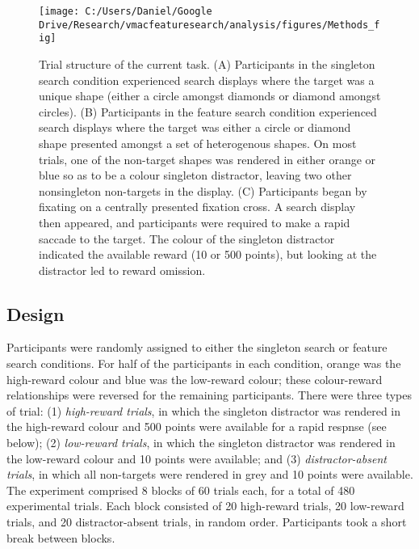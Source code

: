 \documentclass[man, a4paper, noextraspace, 11pt,floatsintext]{apa6}
\theoremstyle{definition}
\theoremstyle{definition}
\theoremstyle{definition}
\theoremstyle{remark}
\begin{document}
\begin{figure}[!h]

{\centering \texttt{[image: C:/Users/Daniel/Google Drive/Research/vmacfeaturesearch/analysis/figures/Methods\_fig]} 

}

\caption{Trial structure of the current task. (A) Participants in
the singleton search condition experienced search displays where the
target was a unique shape (either a circle amongst diamonds or diamond
amongst circles). (B) Participants in the feature search condition
experienced search displays where the target was either a circle or
diamond shape presented amongst a set of heterogenous shapes. On most
trials, one of the non-target shapes was rendered in either orange or
blue so as to be a colour singleton distractor, leaving two other
nonsingleton non-targets in the display. (C) Participants began by
fixating on a centrally presented fixation cross. A search display then
appeared, and participants were required to make a rapid saccade to the
target. The colour of the singleton distractor indicated the available
reward (10 or 500 points), but looking at the distractor led to reward
omission.}\label{fig:methodFig}
\end{figure}

\subsection{Design}\label{design}

Participants were randomly assigned to either the singleton search or
feature search conditions. For half of the participants in each
condition, orange was the high-reward colour and blue was the low-reward
colour; these colour-reward relationships were reversed for the
remaining participants. There were three types of trial: (1)
\emph{high-reward trials}, in which the singleton distractor was
rendered in the high-reward colour and 500 points were available for a
rapid respnse (see below); (2) \emph{low-reward trials}, in which the
singleton distractor was rendered in the low-reward colour and 10 points
were available; and (3) \emph{distractor-absent trials}, in which all
non-targets were rendered in grey and 10 points were available. The
experiment comprised 8 blocks of 60 trials each, for a total of 480
experimental trials. Each block consisted of 20 high-reward trials, 20
low-reward trials, and 20 distractor-absent trials, in random order.
Participants took a short break between blocks.
\end{document}
